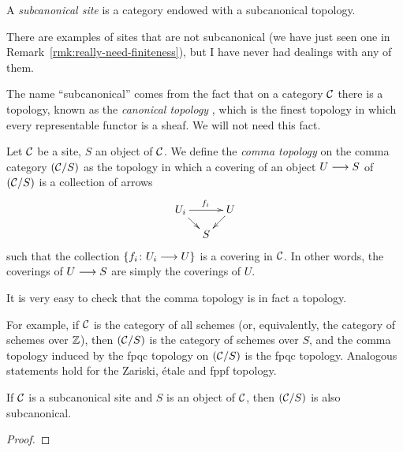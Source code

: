 \begin{2   CONTRAVARIANT FUNCTORS}
\begin{2.3 Sheaves in Grothendieck topologies}
\begin{definition}
A \emph{subcanonical site}%
%
 is a category endowed with a subcanonical topology.
\end{definition}

There are examples of sites that are not subcanonical (we have just seen one in Remark~\ref{rmk:really-need-finiteness}), but I have never had dealings with any of them.

The name ``subcanonical'' comes from the fact that on a category $\mathcal{C}$ there is a topology, known as the \emph{canonical topology}%
%
, which is the finest topology in which every representable functor is a sheaf. We will not need this fact.


\begin{definition}\label{def:comma-topology}
Let $\mathcal{C}$ be a site, $S$ an object of $\mathcal{C}$. We define the \emph{comma topology}%
%
 on the comma category $(\mathcal{C}/S)$ as the topology in which a covering of  an object $U \arr S$ of $(\mathcal{C}/S)$ is a collection of arrows
   \[
   \xymatrix@-15pt{
   U_i\ar[rr]^{f_i}\ar[rd] && U\ar[ld]\\
   &S
   }
   \]
such that the collection $\{f_i \colon U_i \arr U\}$ is a covering in $\mathcal{C}$. In other words, the coverings of $U \arr S$ are simply the coverings of $U$.
\end{definition}

It is very easy to check that the comma topology is in fact a topology.

For example, if $\mathcal{C}$ is the category of all schemes (or, equivalently, the category of schemes over $\mathbb{Z}$), then $(\mathcal{C}/S)$ is the category of schemes over $S$, and the comma topology induced by the fpqc topology on $(\mathcal{C}/S)$ is the fpqc topology. Analogous statements hold for the Zariski, \'etale and fppf topology.


\begin{proposition}\label{prop:comma-subcanonical}
If $\mathcal{C}$ is a subcanonical site and $S$ is an object of $\mathcal{C}$, then $(\mathcal{C}/S)$ is also subcanonical.
\end{proposition}

\begin{proof}


\end{proof}
\end{2.3 Sheaves in Grothendieck topologies}
\end{2   CONTRAVARIANT FUNCTORS}
